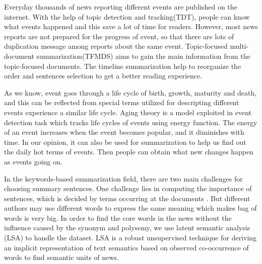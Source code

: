\documentclass{llncs}
\begin{document}

Everyday thousands of news reporting different events are published on the internet. With the help of topic detection and tracking(TDT), people can know what events happened and this save a lot of time for readers. However, most news reports are not prepared for the progress of event, so that there are lots of duplication message among reports about the same event. Topic-focused multi-document summarization(TFMDS) aims to gain the main information from the topic-focused documents. The timeline summarization help to reorganize the order and sentences selection to get a better reading experience.


As we know, event goes through a life cycle of birth, growth, maturity and death, and this can be reflected from special terms utilized for descripting different events experience a similar life cycle. Aging theory \cite{chen2003life} is a model exploited in event detection task which tracks life cycles of events using energy function. The energy of an event increases when the event becomes popular, and it diminishes with time. In our opinion, it can also be used for summarization to help us find out the daily hot terms of events. Then people can obtain what new changes happen as events going on.

In the keywords-based summarization field, there are two main challenges for choosing summary sentences. One challenge lies in computing the importance of sentences, which is decided by terms occurring at the documents . But different authors may use different words to express the same meaning which makes bag of words is very big. In order to find the core words in the news without the influence caused by the synonym and polysemy, we use latent semantic analysis (LSA) \cite{1990-Deerwester-p391-407} to handle the dataset. LSA is a robust unsupervised technique for deriving an implicit representation of text semantics based on observed co-occurrence of words to find semantic units of news.
\end{document}

